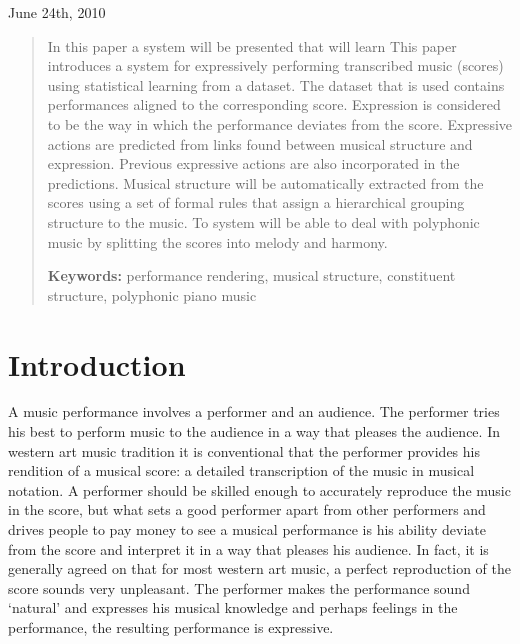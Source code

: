 \documentclass[a4paper,10pt]{article}
\begin{document}
\begin{titlepage}
\begin{center}
\vspace{1.5cm}

June 24th, 2010

\end{center}

\end{titlepage}



\begin{abstract}
In this paper a system will be presented that will learn 
This paper introduces a system for expressively performing transcribed music (scores) using statistical learning from a dataset. The dataset that is used contains performances aligned to the corresponding score. Expression is considered to be the way in which the performance deviates from the score. Expressive actions are predicted from links found between musical structure and expression. Previous expressive actions are also incorporated in the predictions. Musical structure will be automatically extracted from the scores using a set of formal rules that assign a hierarchical grouping structure to the music. To system will be able to deal with polyphonic music by splitting the scores into melody and harmony.

{\bf Keywords:} performance rendering, musical structure, constituent structure, polyphonic piano music
\end{abstract}
\section{Introduction}

A music performance involves a performer and an audience. The performer tries his best to perform music to the audience in a way that pleases the audience. In western art music tradition it is conventional that the performer provides his rendition of a musical score: a detailed transcription of the music in musical notation. A performer should be skilled enough to accurately reproduce the music in the score, but what sets a good performer apart from other performers and drives people to pay money to see a musical performance is his ability deviate from the score and interpret it in a way that pleases his audience. In fact, it is generally agreed on that for most western art music, a perfect reproduction of the score sounds very unpleasant. The performer makes the performance sound `natural' and expresses his musical knowledge and perhaps feelings in the performance, the resulting performance is expressive.
\end{document}
